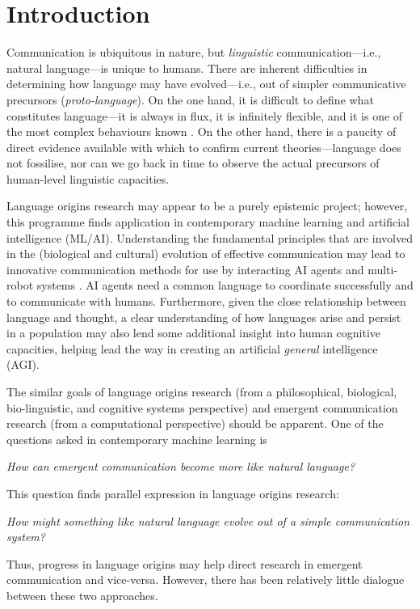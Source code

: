 \documentclass{article}
\begin{document}
\section{Introduction}

Communication is ubiquitous in nature, but {\it linguistic} communication---i.e., natural language---is unique to humans. There are inherent difficulties in determining how language may have evolved---i.e., out of simpler communicative precursors ({\it proto-language}). On the one hand, it is difficult to define what constitutes language---it is always in flux, it is infinitely flexible, and it is one of the most complex behaviours known \citep{Christiansen-Kirby-2003}. On the other hand, there is a paucity of direct evidence available with which to confirm current theories---language does not fossilise, nor can we go back in time to observe the actual precursors of human-level linguistic capacities.

Language origins research may appear to be a purely epistemic project; however, this programme finds application in contemporary machine learning and artificial intelligence (ML/AI). Understanding the fundamental principles that are involved in the (biological and cultural) evolution of effective communication may lead to innovative communication methods for use by interacting AI agents and multi-robot systems \citep{Wagner-et-al-2003}. AI agents need a common language to coordinate successfully and to communicate with humans. Furthermore, given the close relationship between language and thought, a clear understanding of how languages arise and persist in a population may also lend some additional insight into human cognitive capacities, helping lead the way in creating an artificial {\it general} intelligence (AGI).

The similar goals of language origins research (from a philosophical, biological, bio-linguistic, and cognitive systems perspective) and emergent communication research (from a computational perspective) should be apparent. One of the questions asked in contemporary machine learning is
%
\begin{center}
    {\it How can emergent communication become more like natural language?}
\end{center} 
%
This question finds parallel expression in language origins research:
%
\begin{center}
    {\it How might something like natural language evolve out of a simple communication system?}
\end{center}
%
Thus, progress in language origins may help direct research in emergent communication and vice-versa. However, there has been relatively little dialogue between these two approaches.
\end{document}
